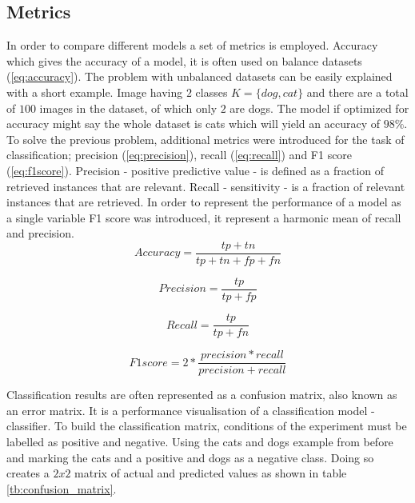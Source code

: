 \documentclass[times, utf8, diplomski]{fer}
\begin{document}
\subsection{Metrics}
\label{se:metrics}
In order to compare different models a set of metrics is employed. Accuracy which gives the accuracy of a model, it is often used on balance datasets (\ref{eq:accuracy}). The problem with unbalanced datasets can be easily explained with a short example. Image having $2$ classes $K=\{dog,cat\}$ and there are a total of $100$ images in the dataset, of which only $2$ are dogs. The model if optimized for accuracy might say the whole dataset is cats which will yield an accuracy of $98\%$. To solve the previous problem, additional metrics were introduced for the task of classification; precision (\ref{eq:precision}), recall (\ref{eq:recall}) and F1 score (\ref{eq:f1score}). Precision - positive predictive value - is defined as a fraction of retrieved instances that are relevant. Recall - sensitivity - is a fraction of relevant instances that are retrieved. In order to represent the performance of a model as a single variable F1 score was introduced, it represent a harmonic mean of recall and precision.
\begin{equation} \label{eq:accuracy}
	Accuracy = \frac{tp + tn}{tp + tn + fp + fn}
\end{equation}

\begin{equation} \label{eq:precision}
	Precision = \frac{tp}{tp + fp}
\end{equation}

\begin{equation} \label{eq:recall}
	Recall = \frac{tp}{tp + fn}
\end{equation}

\begin{equation} \label{eq:f1score}
	F1 score = 2 * \frac{precision * recall}{precision + recall}
\end{equation}



Classification results are often represented as a confusion matrix, also known as an error matrix.  It is a performance visualisation of a classification model - classifier. To build the classification matrix, conditions of the experiment must be labelled as positive and negative. Using the cats and dogs example from before and marking the cats and a positive and dogs as a negative class. Doing so creates a $2x2$ matrix of actual and predicted values as shown in table \ref{tb:confusion_matrix}.
\end{document}
